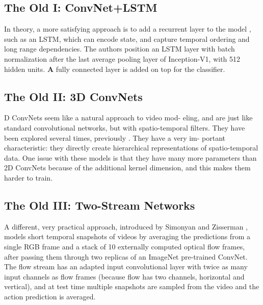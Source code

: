 \documentclass[10pt,twocolumn,letterpaper]{article}
\begin{document}
\subsection{The Old I: ConvNet+LSTM}
In theory, a more satisfying approach is to add a recurrent layer to the model \cite{donahue2015long}, such as an LSTM, which can
encode state, and capture temporal ordering and long range
dependencies. The authors position an LSTM layer with batch normalization after the
last average pooling layer of Inception-V1, with 512 hidden units. \textbf{A} fully connected layer is added on top for the
classifier.
\subsection{The Old II: 3D ConvNets}
D ConvNets seem like a natural approach to video mod-
eling, and are just like standard convolutional networks, but
with spatio-temporal filters. They have been explored several times, previously \cite{ji20133d,taylor2010convolutional}. They have a very im-
portant characteristic: they directly create hierarchical representations of spatio-temporal data. One issue with these
models is that they have many more parameters than 2D
ConvNets because of the additional kernel dimension, and this makes them harder to train.
\subsection{The Old III: Two-Stream Networks}
A different, very practical approach, introduced by Simonyan and Zisserman \cite{simonyan2014two}, models short temporal snapshots of videos by averaging the predictions from a single
RGB frame and a stack of 10 externally computed optical flow frames, after passing them through two replicas of an
ImageNet pre-trained ConvNet. The flow stream has an
adapted input convolutional layer with twice as many input
channels as flow frames (because flow has two channels,
horizontal and vertical), and at test time multiple snapshots
are sampled from the video and the action prediction is averaged.
\end{document}
